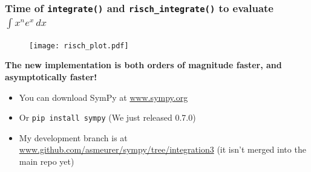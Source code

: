 \documentclass{beamer}
\numberwithin{equation}{section} %
\newcommand{\rischintegrate}{\texttt{risch\_integrate()}}
\begin{document}
\begin{frame}
    \frametitle{Time of \texttt{integrate()} and \rischintegrate{} to evaluate $\int x^ne^x\,dx$}
    \begin{figure}
    \texttt{[image: risch\_plot.pdf]}
    \end{figure}
    {\bf The new implementation is both orders of magnitude faster, and
    asymptotically faster!}
\end{frame}

\begin{frame}
    \begin{figure}[t!]
    \end{figure}
\end{frame}

\begin{frame}
    \begin{itemize}
        \item You can download SymPy at \url{www.sympy.org}
        \item Or \texttt{pip install sympy} (We just released 0.7.0)
        \item My development branch is at
        \url{www.github.com/asmeurer/sympy/tree/integration3} (it
        isn't merged into the main repo yet)
    \end{itemize}
\end{frame}


\end{document}
